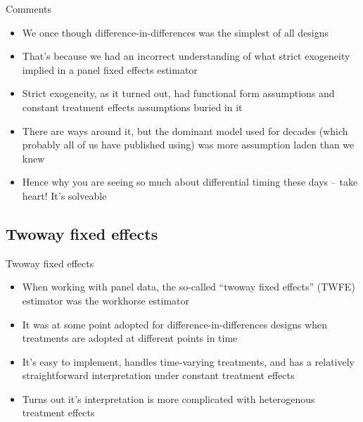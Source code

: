 \documentclass{beamer}
\begin{document}
\begin{frame}{Comments}

\begin{itemize}

\item We once though difference-in-differences was the simplest of all designs
\item That's because we had an incorrect understanding of what strict exogeneity implied in a panel fixed effects estimator
\item Strict exogeneity, as it turned out, had functional form assumptions and constant treatment effects assumptions buried in it
\item There are ways around it, but the dominant model used for decades (which probably all of us have published using) was more assumption laden than we knew
\item Hence why you are seeing so much about differential timing these days -- take heart!  It's solveable

\end{itemize}

\end{frame}


\subsection{Twoway fixed effects }


\begin{frame}{Twoway fixed effects}

\begin{itemize}
\item When working with panel data, the so-called ``twoway fixed effects'' (TWFE) estimator was the workhorse estimator
\item It was at some point adopted for difference-in-differences designs when treatments are adopted at different points in time 
\item It's easy to implement, handles time-varying treatments, and has a relatively straightforward interpretation under constant treatment effects
\item Turns out it's interpretation is more complicated with heterogenous treatment effects
\end{itemize}

\end{frame}
\end{document}
